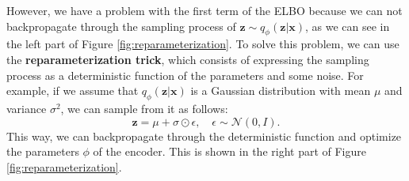 However, we have a problem with the first term of the ELBO because we can not backpropagate through the sampling process of $\mathbf{z}\sim q_{\phi}(\mathbf{z}|\mathbf{x})$, 
as we can see in the left part of Figure \ref{fig:reparameterization}. To solve this problem, we can use the \textbf{reparameterization trick}, which consists of expressing the sampling 
process as a deterministic function of the parameters and some noise. For example, if we assume that $q_{\phi}(\mathbf{z}|\mathbf{x})$ is a Gaussian distribution with mean $\mu$ and 
variance $\sigma^2$, we can sample from it as follows: 
\begin{equation}
    \mathbf{z} = \mu + \sigma \odot \epsilon, \quad \epsilon \sim \mathcal{N}(0, I).
\end{equation}
This way, we can backpropagate through the deterministic function and optimize the parameters $\phi$ of the encoder. This is shown in the right part of Figure \ref{fig:reparameterization}.

